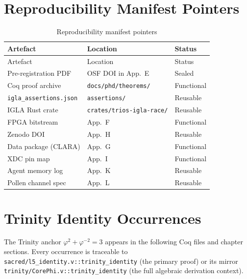 \section{Reproducibility Manifest Pointers}
\label{sec:A-repro-manifest}

\begin{longtable}{lll}
\toprule
Artefact & Location & Status \\
\midrule
\endfirsthead
\toprule
Artefact & Location & Status \\
\midrule
\endhead
\bottomrule
\endfoot
\bottomrule
\caption{Reproducibility manifest pointers}
\endlastfoot
Pre-registration PDF & OSF DOI in App.\ E & Sealed \\
Coq proof archive & \texttt{docs/phd/theorems/} & Functional \\
\texttt{igla\_assertions.json} & \texttt{assertions/} & Reusable \\
IGLA Rust crate & \texttt{crates/trios-igla-race/} & Reusable \\
FPGA bitstream & App.\ F & Functional \\
Zenodo DOI & App.\ H & Reusable \\
Data package (CLARA) & App.\ G & Functional \\
XDC pin map & App.\ I & Functional \\
Agent memory log & App.\ K & Reusable \\
Pollen channel spec & App.\ L & Reusable \\
\end{longtable}

\section{Trinity Identity Occurrences}
\label{sec:A-trinity-occ}

The Trinity anchor $\varphi^{2}+\varphi^{-2}=3$ appears in the
following Coq files and chapter sections.  Every occurrence is
traceable to \texttt{sacred/l5\_identity.v::trinity\_identity}
(the primary proof) or its mirror
\texttt{trinity/CorePhi.v::trinity\_identity}
(the full algebraic derivation context).

